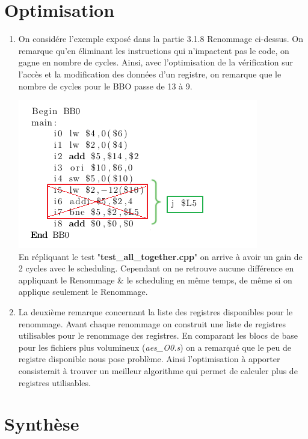 \documentclass[11pt, openany]{article}
\begin{document}
\section{Optimisation}
\begin{enumerate}
    \item On considére l’exemple exposé dans la partie 3.1.8 Renommage ci-dessus. On remarque qu'en éliminant les instructions qui n'impactent pas le code, on gagne en nombre de cycles.
    Ainsi, avec l'optimisation de la vérification sur l'accès et la modification des données d'un registre, on remarque que le nombre de cycles pour le BBO passe de 13 à 9.
    
    \includegraphics[scale=0.8]{images/BB0TD2.png}~\\[1.5cm]
    
    En répliquant le test "\textbf{test\_all\_together.cpp}" on arrive à avoir un gain de 2 cycles avec le scheduling. Cependant on ne retrouve aucune différence en appliquant le Renommage \& le scheduling en même temps, de même si on applique seulement le Renommage.
    
    \item La deuxième remarque concernant la liste des registres disponibles pour le renommage. Avant chaque renommage on construit une liste de registres utilisables pour le renommage des registres. En comparant les blocs de base pour les fichiers plus volumineux (\textit{aes\_O0.s}) on a remarqué que le peu de registre disponible nous pose problème. Ainsi l'optimisation à apporter consisterait à trouver un meilleur algorithme qui permet de calculer plus de registres utilisables.
\end{enumerate}

\section{Synthèse}
 
\end{document}
